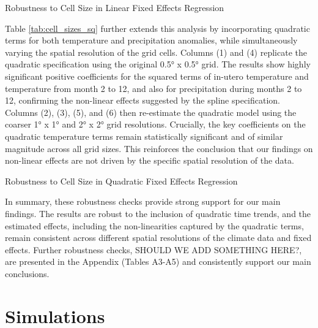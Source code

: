 \documentclass[a4paper]{article}
\begin{document}
\begin{table}[t!]
\centering
\caption{Robustness to Cell Size in Linear Fixed Effects Regression}
\label{tab:cell_sizes}
\begin{adjustbox}{max width=\linewidth}

\end{adjustbox}
\end{table}

Table \ref{tab:cell_sizes_sq} further extends this analysis by incorporating quadratic terms for both temperature and precipitation anomalies, while simultaneously varying the spatial resolution of the grid cells. Columns (1) and (4) replicate the quadratic specification using the original 0.5° x 0.5° grid.  The results show highly significant positive coefficients for the squared terms of in-utero temperature and temperature from month 2 to 12, and also for precipitation during months 2 to 12, confirming the non-linear effects suggested by the spline specification. Columns (2), (3), (5), and (6) then re-estimate the quadratic model using the coarser 1° x 1° and 2° x 2° grid resolutions. Crucially, the key coefficients on the quadratic temperature terms remain statistically significant and of similar magnitude across all grid sizes. This reinforces the conclusion that our findings on non-linear effects are not driven by the specific spatial resolution of the data.


\begin{table}[t!]
\centering
\caption{Robustness to Cell Size in Quadratic Fixed Effects Regression}
\label{tab:cell_sizes_sq}
\begin{adjustbox}{max width=\linewidth}

\end{adjustbox}
\end{table}


In summary, these robustness checks provide strong support for our main findings. The results are robust to the inclusion of quadratic time trends, and the estimated effects, including the non-linearities captured by the quadratic terms, remain consistent across different spatial resolutions of the climate data and fixed effects. Further robustness checks, SHOULD WE ADD SOMETHING HERE?, are presented in the Appendix (Tables A3-A5) and consistently support our main conclusions.


\section{Simulations}
\end{document}
